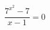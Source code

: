 \begin{ex}[type=equation]
	\begin{condition}
		\( \dfrac{7^{x^2}-7}{x-1}=0 \)
	\end{condition}
\end{ex}